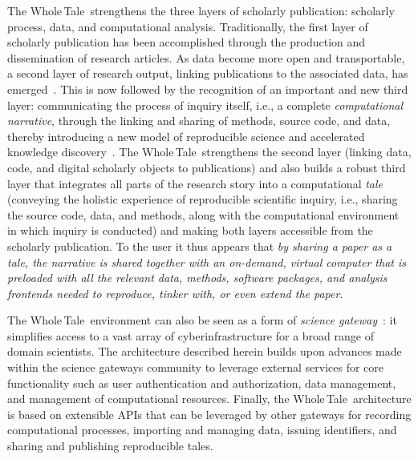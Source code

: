 \documentclass{elsarticle}
\newcommand{\wt}{Whole\,Tale}
\begin{document}
The \wt\ strengthens the three layers of scholarly publication: scholarly process, data, 
and computational analysis. Traditionally, the first layer of scholarly publication has been accomplished 
through the production and dissemination of research articles. As data become more open and transportable, a 
second layer of research output, linking publications to the associated data, has emerged~\cite{kratz14datapub}. This is now  followed by the recognition of an important and new third layer: communicating the process of inquiry itself, 
i.e., a complete \emph{computational narrative}, through the linking and sharing of methods, source code, and data, 
thereby introducing a new model of reproducible science and accelerated knowledge discovery~\cite{Stodden1240}. The \wt\ strengthens the second layer (linking data, code, and digital scholarly objects to publications) and also builds
a robust third layer that integrates all parts of the research story into a computational \emph{tale} (conveying the holistic experience of reproducible scientific inquiry, i.e., sharing the source code, data, and methods, along with the computational environment in which inquiry is conducted) and making both layers accessible from the scholarly publication. To the user it thus appears that \emph{by sharing a paper as a tale, the narrative is shared together with an on-demand, virtual computer that is preloaded with all the relevant data, methods, software packages, and analysis frontends needed to reproduce, tinker with, or even extend the paper}. 


The \wt\ environment can also be seen as a form of \emph{science gateway}~\cite{wilkins07gateways}: it 
simplifies access to a vast array of cyberinfrastructure for a broad range of domain scientists. The architecture
described herein builds upon advances made within the science gateways community to leverage external
services for core functionality such as user authentication and authorization, data management, and 
 management of computational resources. Finally, the \wt\ architecture is based on extensible APIs that 
can be leveraged by other gateways for recording computational processes, importing 
and managing data, issuing identifiers, and sharing and publishing reproducible tales.
\end{document}
